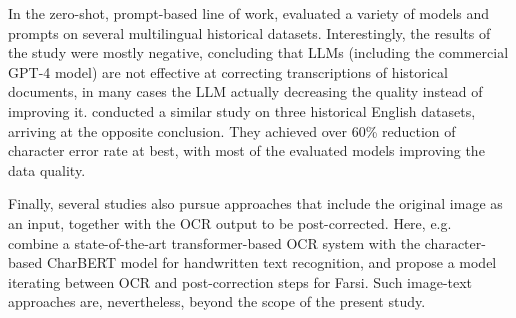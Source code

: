 In the zero-shot, prompt-based line of work, \citet{boros2024postcorrection} evaluated a variety of models and prompts on several multilingual historical datasets. Interestingly, the results of the study were mostly negative, concluding that LLMs (including the commercial GPT-4 model) are not effective at correcting transcriptions of historical documents, in many cases the LLM actually decreasing the quality instead of improving it. \citet{bourne2024clocrc} conducted a similar study on three historical English datasets, arriving at the opposite conclusion. They achieved over 60\% reduction of character error rate at best, with most of the evaluated models improving the data quality.

Finally, several studies also pursue approaches that include the original image as an input, together with the OCR output to be post-corrected. Here, e.g.\ \citet{chen2024trocrmeets} combine a state-of-the-art transformer-based OCR system with the character-based CharBERT model for handwritten text recognition, and \citet{fahandari2024farsi} propose a model iterating between OCR and post-correction steps for Farsi. Such image-text approaches are, nevertheless, beyond the scope of the present study.






